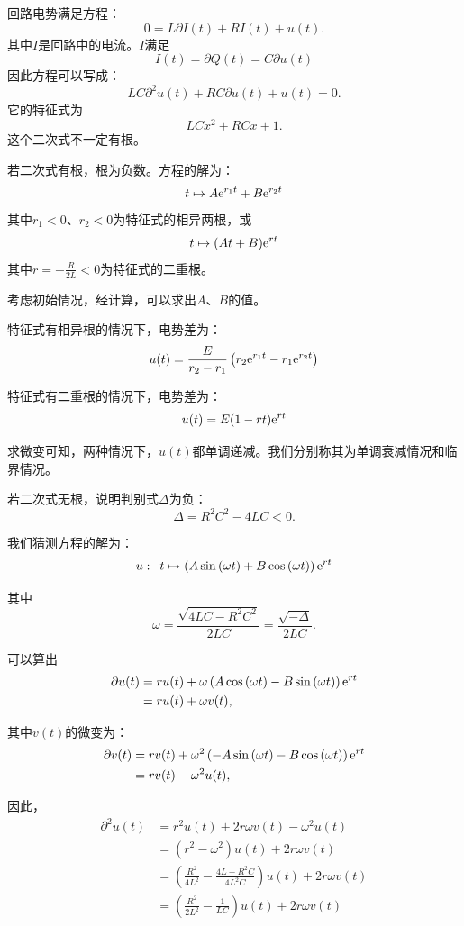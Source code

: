 \documentclass[12pt,UTF8]{ctexbook}
\begin{document}
\begin{so}
    回路电势满足方程：
    $$ 0 = L\partial I(t) + RI(t) + u(t).$$
    其中$I$是回路中的电流。$I$满足
    $$ I(t) = \partial Q(t) = C\partial u(t) $$
    因此方程可以写成：
    $$ LC\partial^2 u(t) + RC\partial u(t) + u(t) = 0.$$
    它的特征式为
    $$ LC x^2 + RC x + 1.$$
    这个二次式不一定有根。

    若二次式有根，根为负数。方程的解为：
    $$ t \mapsto A\mathrm{e}^{r_1t} + B\mathrm{e}^{r_2t} $$
    其中$r_1<0$、$r_2<0$为特征式的相异两根，或
    $$ t \mapsto (At + B)\mathrm{e}^{rt} $$
    其中$r = -\frac{R}{2L} < 0$为特征式的二重根。

    考虑初始情况，经计算，可以求出$A$、$B$的值。

    特征式有相异根的情况下，电势差为：
    $$ u(t) = \frac{E}{r_2 - r_1}\left(r_2\mathrm{e}^{r_1t} - r_1\mathrm{e}^{r_2t}\right) $$ 

    特征式有二重根的情况下，电势差为：
    $$ u(t) =  E(1 - rt)\mathrm{e}^{rt}$$

    求微变可知，两种情况下，$u(t)$都单调递减。我们分别称其为单调衰减情况和临界情况。

    若二次式无根，说明判别式$\Delta$为负：
    $$ \Delta = R^2C^2 - 4LC < 0.$$

    我们猜测方程的解为：
    $$ u: \,\,\,t \mapsto \left(A\sin{(\omega t)} + B\cos{(\omega t)}\right)\mathrm{e}^{rt} $$

    其中
    $$\omega = \frac{\sqrt{4LC - R^2C^2}}{2LC} = \frac{\sqrt{-\Delta}}{2LC}. $$

    可以算出
    \begin{align*}
        \partial u(t) &= ru(t) + \omega \left(A\cos{(\omega t)} - B\sin{(\omega t)}\right)\mathrm{e}^{rt} \\
        &= ru(t) + \omega v(t),
    \end{align*}

    其中$v(t)$的微变为：
    \begin{align*}
        \partial v(t) &= rv(t) + \omega^2 \left(- A\sin{(\omega t)} - B\cos{(\omega t)}\right)\mathrm{e}^{rt} \\
        &= rv(t) - \omega^2 u(t),
    \end{align*}

    因此，
    \begin{align*}        
        \partial^2 u(t) &= r^2u(t) + 2r\omega v(t) - \omega^2u(t) \\
        &= (r^2 - \omega^2 )u(t) + 2r\omega v(t) \\
        &= \left(\frac{R^2}{4L^2} - \frac{4L - R^2C}{4L^2C}\right)u(t) + 2r\omega v(t)\\
        &= \left(\frac{R^2}{2L^2} - \frac{1}{LC} \right)u(t) + 2r\omega v(t)
    \end{align*}


\end{so}
\end{document}
